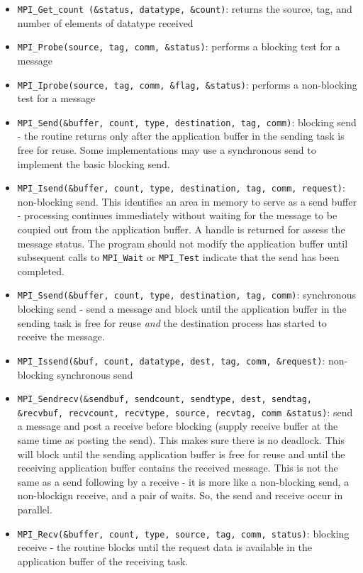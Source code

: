 \documentclass[10pt]{article}
\begin{document}
\begin{flushleft}
\begin{itemize}
\item {\tt MPI\_Get\_count (\&status, datatype, \&count)}: returns the source, tag, and number of elements of datatype received
\item {\tt MPI\_Probe(source, tag, comm, \&status)}: performs a blocking test for a message
\item {\tt MPI\_Iprobe(source, tag, comm, \&flag, \&status)}: performs a non-blocking test for a message
\item {\tt MPI\_Send(\&buffer, count, type, destination, tag, comm)}: blocking send - the routine returns only after the application buffer in the sending task is free for reuse. Some implementations may use a synchronous send to implement the basic blocking send. 
\item {\tt MPI\_Isend(\&buffer, count, type, destination, tag, comm, request)}: non-blocking send. This identifies an area in memory to serve as a send buffer - processing continues immediately without waiting for the message to be coupied out from the application buffer. A handle is returned for assess the message status. The program should not modify the application buffer until subsequent calls to {\tt MPI\_Wait} or {\tt MPI\_Test} indicate that the send has been completed.
\item {\tt MPI\_Ssend(\&buffer, count, type, destination, tag, comm)}: synchronous blocking send - send a message and block until the application buffer in the sending task is free for reuse \textit{and} the destination process has started to receive the message. 
\item {\tt MPI\_Issend(\&buf, count, datatype, dest, tag, comm, \&request)}: non-blocking synchronous send
\item {\tt MPI\_Sendrecv(\&sendbuf, sendcount, sendtype, dest, sendtag, \&recvbuf, recvcount, recvtype, source, recvtag, comm \&status)}: send a message and post a receive before blocking (supply receive buffer at the same time as posting the send). This makes sure there is no deadlock. This will block until the sending application buffer is free for reuse and until the receiving application buffer contains the received message. This is not the same as a send following by a receive - it is more like a non-blocking send, a non-blockign receive, and a pair of waits. So, the send and receive occur in parallel. 
\item {\tt MPI\_Recv(\&buffer, count, type, source, tag, comm, status)}: blocking receive - the routine blocks until the request data is available in the application buffer of the receiving task. 

\end{itemize}
\end{flushleft}
\end{document}
